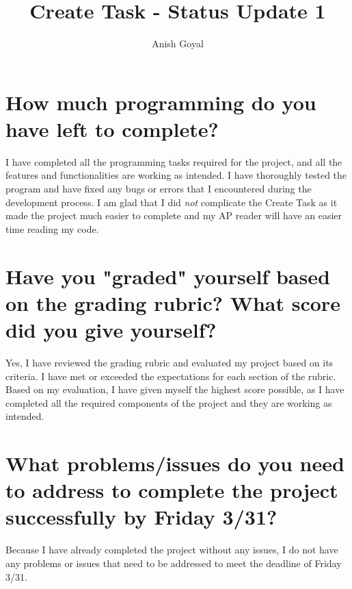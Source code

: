 \documentclass[stu]{apa7}
\title{Create Task - Status Update 1}
\author{Anish Goyal}
\begin{document}
\maketitle
\tableofcontents
\newpage
\section{How much programming do you have left to complete?}
I have completed all the programming tasks required for the project, and all the features and functionalities are working as intended. I have thoroughly tested the program and have fixed any bugs or errors that I encountered during the development process. I am glad that I did \emph{not} complicate the Create Task as it made the project much easier to complete and my AP reader will have an easier time reading my code. 

\section{Have you "graded" yourself based on the grading rubric?  What score did you give yourself?}
Yes, I have reviewed the grading rubric and evaluated my project based on its criteria. I have met or exceeded the expectations for each section of the rubric. Based on my evaluation, I have given myself the highest score possible, as I have completed all the required components of the project and they are working as intended.

\section{What problems/issues do you need to address to complete the project successfully by Friday 3/31?}
Because I have already completed the project without any issues, I do not have any problems or issues that need to be addressed to meet the deadline of Friday 3/31.
\end{document}

